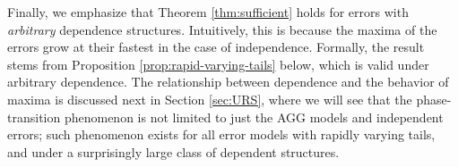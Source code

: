 Finally, we emphasize that Theorem \ref{thm:sufficient} holds for errors with \emph{arbitrary} 
dependence structures. Intuitively, this is because the maxima of the errors grow at their 
fastest in the case of independence. Formally, the result stems from Proposition \ref{prop:rapid-varying-tails} below, which is valid under arbitrary dependence.
The relationship between dependence and the behavior of maxima is discussed next in Section \ref{sec:URS}, where we will see that the phase-transition phenomenon is not limited to just the AGG models and independent errors; such phenomenon exists for all error models with rapidly varying tails, and under a surprisingly large class of dependent structures.
